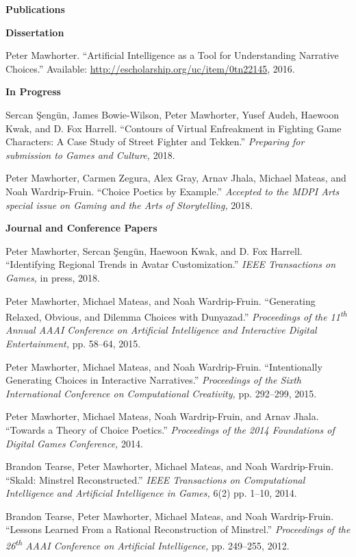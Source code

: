 \documentclass[11pt]{article}
\newenvironment{pubs}[1]{%
  \vspace{8pt}\textbf{\Large #1} \hrulefill\vspace{6pt}
  \begin{adjustwidth}{14pt}{0pt}
  \setlength{\parskip}{4pt}
  \setlength{\parindent}{-8pt}
}{%
  \end{adjustwidth}
}
\newcommand{\plainpub}[4]{%
\begin{samepage}
#1. ``#2.'' #3, #4.

\end{samepage}%
}
\newcommand{\fullpub}[5]{%
\begin{samepage}
#1. ``#2.'' \textit{#3,} #4, #5.

\end{samepage}%
}
\newcommand{\nppub}[4]{%
\begin{samepage}
#1. ``#2.'' \textit{#3,} #4.

\end{samepage}%
}
\newcommand{\heading}[1]{\textbf{\large #1}\vspace{4pt}}
\newcommand{\tsup}[1]{\textsuperscript{#1}}
\begin{document}
\begin{pubs}{Publications}

\hspace{-8pt}\heading{Dissertation}

\plainpub{Peter Mawhorter}{Artificial Intelligence as a Tool for Understanding Narrative Choices}{\hfill\break Available: \url{http://escholarship.org/uc/item/0tn22145}}{2016}

\vspace{6pt}
\heading{In Progress}

\nppub{Sercan \c{S}eng\"un, James Bowie-Wilson, Peter Mawhorter, Yusef Audeh, Haewoon Kwak, and D. Fox Harrell}{Contours of Virtual Enfreakment in Fighting Game Characters: A Case Study of Street Fighter and Tekken}{Preparing for submission to Games and Culture}{2018}

\nppub{Peter Mawhorter, Carmen Zegura, Alex Gray, Arnav Jhala, Michael Mateas, and Noah Wardrip-Fruin}{Choice Poetics by Example}{Accepted to the MDPI Arts special issue on Gaming and the Arts of Storytelling}{2018}

\vspace{6pt}
\heading{Journal and Conference Papers}

  \fullpub{Peter Mawhorter, Sercan \c{S}eng\"un, Haewoon Kwak, and D. Fox Harrell}{Identifying Regional Trends in Avatar Customization}{IEEE Transactions on Games}{in press}{2018}

\fullpub{Peter Mawhorter, Michael Mateas, and Noah Wardrip-Fruin}{Generating Relaxed, Obvious, and Dilemma Choices with Dunyazad}{Proceedings of the 11\tsup{th} Annual AAAI Conference on Artificial Intelligence and Interactive Digital Entertainment}{pp. 58--64}{2015}

\fullpub{Peter Mawhorter, Michael Mateas, and Noah Wardrip-Fruin}{Intentionally Generating Choices in Interactive Narratives}{Proceedings of the Sixth International Conference on Computational Creativity}{pp. 292--299}{2015}

\nppub{Peter Mawhorter, Michael Mateas, Noah Wardrip-Fruin, and Arnav Jhala}{Towards a Theory of Choice Poetics}{Proceedings of the 2014 Foundations of Digital Games Conference}{2014}

\fullpub{Brandon Tearse, Peter Mawhorter, Michael Mateas, and Noah Wardrip-Fruin}{Skald: Minstrel Reconstructed}{IEEE Transactions on Computational Intelligence and Artificial Intelligence in Games}{6(2) pp. 1--10}{2014}

\fullpub{Brandon Tearse, Peter Mawhorter, Michael Mateas, and Noah Wardrip-Fruin}{Lessons Learned From a Rational Reconstruction of Minstrel}{Proceedings of the 26\tsup{th} AAAI Conference on Artificial Intelligence}{pp. 249--255}{2012}


\end{pubs}
\end{document}
